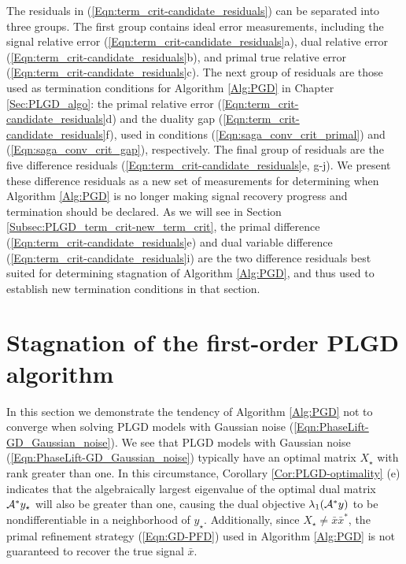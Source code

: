 The residuals in (\ref{Eqn:term_crit-candidate_residuals}) can be separated into three groups.   
The first group contains ideal error measurements, including the signal relative error (\ref{Eqn:term_crit-candidate_residuals}a), dual relative error (\ref{Eqn:term_crit-candidate_residuals}b), and primal true relative error (\ref{Eqn:term_crit-candidate_residuals}c).
The next group of residuals are those used as termination conditions for Algorithm \ref{Alg:PGD} in Chapter \ref{Sec:PLGD_algo}: the primal relative error (\ref{Eqn:term_crit-candidate_residuals}d) and the duality gap (\ref{Eqn:term_crit-candidate_residuals}f), used in conditions (\ref{Eqn:saga_conv_crit_primal}) and (\ref{Eqn:saga_conv_crit_gap}), respectively.
The final group of residuals are the five difference residuals (\ref{Eqn:term_crit-candidate_residuals}e, g-j).
We present these difference residuals as a new set of measurements for determining when Algorithm \ref{Alg:PGD} is no longer making signal recovery progress and termination should be declared.
As we will see in Section \ref{Subsec:PLGD_term_crit-new_term_crit}, the primal difference (\ref{Eqn:term_crit-candidate_residuals}e) and dual variable difference (\ref{Eqn:term_crit-candidate_residuals}i) are the two difference residuals best suited for determining stagnation of Algorithm \ref{Alg:PGD}, and thus used to establish new termination conditions in that section.









\section{Stagnation of the first-order PLGD algorithm} 		\label{Subsec:PLGD_term_crit-stagnation}





In this section we demonstrate the tendency of Algorithm \ref{Alg:PGD} not to converge when solving PLGD models with Gaussian noise (\ref{Eqn:PhaseLift-GD_Gaussian_noise}).  
We see that PLGD models with Gaussian noise (\ref{Eqn:PhaseLift-GD_Gaussian_noise}) typically have an optimal matrix $X_\star$ with rank greater than one.  
In this circumstance, Corollary \ref{Cor:PLGD-optimality} (e) indicates that the algebraically largest eigenvalue of the optimal dual matrix ${\mathcal A}^*y_\star$ will also be greater than one, causing the dual objective $\lambda_1({\mathcal A}^*y)$ to be nondifferentiable in a neighborhood of $y_\star$.  
Additionally, since $X_\star \neq \bar{x}\bar{x}^*$, the primal refinement strategy (\ref{Eqn:GD-PFD}) used in Algorithm \ref{Alg:PGD} is not guaranteed to recover the true signal $\bar{x}$.


